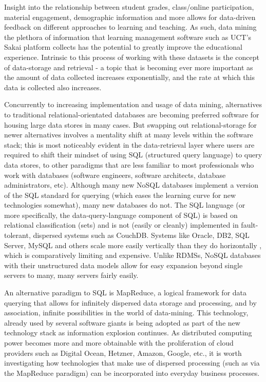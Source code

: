 Insight into the relationship between student grades, class/online participation, material engagement, demographic information and more allows for data-driven feedback on different approaches to learning and teaching. As such, data mining the plethora of information that learning management software such as UCT's Sakai platform collects has the potential to greatly improve the educational experience. Intrinsic to this process of working with these datasets is the concept of data-storage and retrieval - a topic that is becoming ever more important as the amount of data collected increases exponentially, and the rate at which this data is collected also increases.

Concurrently to increasing implementation and usage of data mining, alternatives to traditional relational-orientated databases are becoming preferred software for housing large data stores in many cases. But swapping out relational-storage for newer alternatives involves a mentality shift at many levels within the software stack; this is most noticeably evident in the data-retrieval layer where users are required to shift their mindset of using SQL (structured query language) to query data stores, to other paradigms that are less familiar to most professionals who work with databases (software engineers, software architects, database administrators, etc). Although many new NoSQL databases implement a version of the SQL standard for querying (which eases the learning curve for new technologies somewhat), many new databases do not. The SQL language (or more specifically, the data-query-language component of SQL) is based on relational classification (sets) and is not (easily or cleanly) implemented in fault-tolerant, dispersed systems such as CouchDB. Systems like Oracle, DB2, SQL Server, MySQL and others scale more easily vertically than they do horizontally \cite{couchbaseWhitePaper}, which is comparatively limiting and expensive. Unlike RDMSs, NoSQL databases with their unstructured data models allow for easy expansion beyond single servers to many, many servers fairly easily.

An alternative paradigm to SQL is MapReduce, a logical framework for data querying that allows for infinitely dispersed data storage and processing, and by association, infinite possibilities in the world of data-mining. This technology, already used by several software giants \cite{chandar2010} is being adopted as part of the new technology stack as information explosion continues. As distributed computing power becomes more and more obtainable with the proliferation of cloud providers such as Digital Ocean, Hetzner, Amazon, Google, etc., it is worth investigating how technologies that make use of dispersed processing (such as via the MapReduce paradigm) can be incorporated into everyday business processes.

